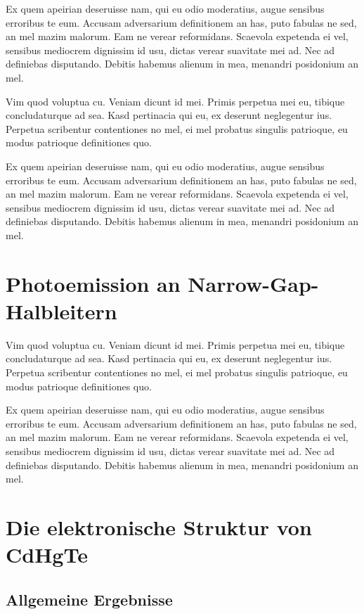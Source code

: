 \documentclass[11pt,twoside,german]{book}
\begin{document}
Ex quem apeirian deseruisse nam, qui eu odio moderatius, augue sensibus erroribus te eum. Accusam adversarium definitionem an has, puto fabulas ne sed, an mel mazim malorum. Eam ne verear reformidans. Scaevola expetenda ei vel, sensibus mediocrem dignissim id usu, dictas verear suavitate mei ad. Nec ad definiebas disputando. Debitis habemus alienum in mea, menandri posidonium an mel.

Vim quod voluptua cu. Veniam dicunt id mei. Primis perpetua mei eu, tibique concludaturque ad sea. Kasd pertinacia qui eu, ex deserunt neglegentur ius. Perpetua scribentur contentiones no mel, ei mel probatus singulis patrioque, eu modus patrioque definitiones quo.


Ex quem apeirian deseruisse nam, qui eu odio moderatius, augue sensibus erroribus te eum. Accusam adversarium definitionem an has, puto fabulas ne sed, an mel mazim malorum. Eam ne verear reformidans. Scaevola expetenda ei vel, sensibus mediocrem dignissim id usu, dictas verear suavitate mei ad. Nec ad definiebas disputando. Debitis habemus alienum in mea, menandri posidonium an mel.

\chapter{Photoemission an Narrow-Gap-Halbleitern}

Vim quod voluptua cu. Veniam dicunt id mei. Primis perpetua mei eu, tibique concludaturque ad sea. Kasd pertinacia qui eu, ex deserunt neglegentur ius. Perpetua scribentur contentiones no mel, ei mel probatus singulis patrioque, eu modus patrioque definitiones quo.


Ex quem apeirian deseruisse nam, qui eu odio moderatius, augue sensibus erroribus te eum. Accusam adversarium definitionem an has, puto fabulas ne sed, an mel mazim malorum. Eam ne verear reformidans. Scaevola expetenda ei vel, sensibus mediocrem dignissim id usu, dictas verear suavitate mei ad. Nec ad definiebas disputando. Debitis habemus alienum in mea, menandri posidonium an mel.


\chapter{Die elektronische Struktur von CdHgTe}
\section{Allgemeine Ergebnisse}
\end{document}
